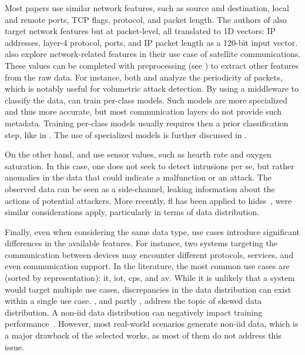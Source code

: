 Most papers \cite{chen_Networkanomalydetection_2020,rathore_BlockSecIoTNetBlockchainbaseddecentralized_2019,nguyen_DIoTFederatedSelflearning_2019,li_DeepFedFederatedDeep_2020,rahman_InternetThingsIntrusion_2020,sun_IntrusionDetectionSegmented_2020,popoola_FederatedDeepLearning_2021a,hei_trustedfeatureaggregator_2020} use similar network features, such as source and destination, local and remote ports, TCP flags, protocol, and packet length.
The authors of \cite{qin_LineSpeedScalableIntrusion_2020a} also target network features but at packet-level, all translated to 1D vectors: IP addresses, layer-4 protocol, ports, and IP packet length as a 120-bit input vector.
\textcite{li_DeepFedFederatedDeep_2020} also explore network-related features in their use case of satellite communications.
These values can be completed with preprocessing (see ) to extract other features from the raw data.
For instance, both \textcite{pahl_AllEyesYou_2018} and \textcite{nguyen_DIoTFederatedSelflearning_2019} analyze the periodicity of packets, which is notably useful for volumetric attack detection.
By using a middleware to classify the data, \textcite{pahl_AllEyesYou_2018} can train per-class models.
Such models are more specialized and thus more accurate, but most communication layers do not provide such metadata.
Training per-class models usually requires then a prior classification step, like in \cite{nguyen_DIoTFederatedSelflearning_2019}.
The use of specialized models is further discussed in .

On the other hand, \textcite{zhang_BlockchainbasedFederatedLearning_2020} and \textcite{schneble_Attackdetectionusing_2019} use sensor values, such as hearth rate and oxygen saturation.
In this case, one does not seek to detect intrusions per se, but rather anomalies in the data that could indicate a malfunction or an attack.
The observed data can be seen as a side-channel, leaking information about the actions of potential attackers.
More recently, \gls{fl} has been applied to \glspl{hids}~\cite{guo_NewFederatedLearning_2023}, were similar considerations apply, particularly in terms of data distribution.

Finally, even when considering the same data type, use cases introduce significant differences in the available features.
For instance, two systems targeting the communication between devices may encounter different protocols, services, and even communication support.
In the literature, the most common use cases are (sorted by representation): \acrfull{it}, \acrfull{iot}, \acrfull{cps}, and \acrfull{av}.
While it is unlikely that a system would target multiple use cases, discrepancies in the data distribution can exist within a single use case.
\textcite{chen_Networkanomalydetection_2020}, and partly \textcite{hei_trustedfeatureaggregator_2020}, address the topic of skewed data distribution.
A non-\gls{iid} data distribution can negatively impact training performance~\cite{yang_FederatedMachineLearning_2019}.
However, most real-world scenarios generate non-\gls{iid} data, which is a major drawback of the selected works, as most of them do not address this issue.


